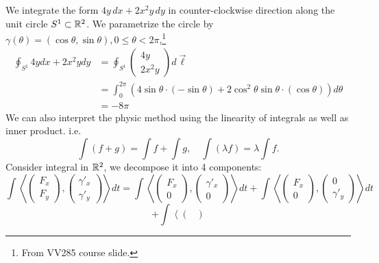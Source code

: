 \documentclass[11pt, t]{beamer}
\begin{document}
\begin{frame}[allowframebreaks]
    We integrate the form $4y\,dx+2x^2y\,dy$ in counter-clockwise direction along the unit circle $S^1\subset\R^2$. We parametrize the circle by $\gamma(\theta)=(\cos\theta,\sin\theta),0\leq
        \theta<2\pi$,\footnote[frame]{From VV285 course slide.}
    $$\begin{aligned}
            \oint_{S^{1}} 4 y d x+2 x^{2} y d y & =\oint_{S^{1}}\left(\begin{array}{c}
                    4 y \\
                    2 x^{2} y
                \end{array}\right) d \vec{\ell}                                                         \\
                                                & =\int_{0}^{2 \pi}\left(4 \sin \theta \cdot(-\sin \theta)+2 \cos ^{2} \theta \sin \theta \cdot(\cos \theta)\right) d \theta \\
                                                & =-8 \pi
        \end{aligned}$$
    \newpage
    We can also interpret the physic method using the linearity of integrals as well as inner product. i.e.
    $$\int(f+g)=\int f+\int g,\quad \int(\lambda f)=\lambda\int f.$$
    Consider integral in $\R^2$, we decompose it into 4 components:
    $$\int\left\langle\begin{pmatrix}
            F_x \\F_y
        \end{pmatrix},\begin{pmatrix}
            \gamma'_x \\\gamma'_y
        \end{pmatrix}\right\rangle dt=
        \int\left\langle\begin{pmatrix}
            F_x \\0
        \end{pmatrix},\begin{pmatrix}
            \gamma'_x \\0
        \end{pmatrix}\right\rangle dt+
        \int\left\langle\begin{pmatrix}
            F_x \\0
        \end{pmatrix},\begin{pmatrix}
            0 \\\gamma'_y
        \end{pmatrix}\right\rangle dt$$$$+
        \int\left\langle\begin{pmatrix}

\end{pmatrix}$$
\end{frame}
\end{document}
